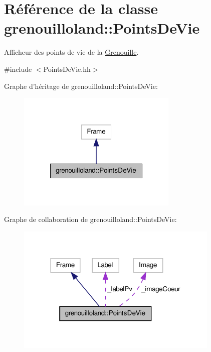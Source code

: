 \hypertarget{classgrenouilloland_1_1PointsDeVie}{\section{Référence de la classe grenouilloland\-:\-:Points\-De\-Vie}
\label{classgrenouilloland_1_1PointsDeVie}
}


Afficheur des points de vie de la \hyperlink{classgrenouilloland_1_1Grenouille}{Grenouille}.  




{\ttfamily \#include $<$Points\-De\-Vie.\-hh$>$}



Graphe d'héritage de grenouilloland\-:\-:Points\-De\-Vie\-:
\nopagebreak
\begin{figure}[H]
\begin{center}
\leavevmode
\includegraphics[width=216pt]{classgrenouilloland_1_1PointsDeVie__inherit__graph}
\end{center}
\end{figure}


Graphe de collaboration de grenouilloland\-:\-:Points\-De\-Vie\-:
\nopagebreak
\begin{figure}[H]
\begin{center}
\leavevmode
\includegraphics[width=274pt]{classgrenouilloland_1_1PointsDeVie__coll__graph}
\end{center}
\end{figure}
